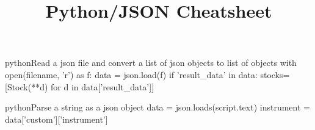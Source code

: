 \documentclass[10pt,a4paper]{article}
\title{\color{w3schools}Python/JSON Cheatsheet
}
\begin{document}
\maketitle
\small
\begin{multicols}{3}

\thispagestyle{empty}
\scriptsize

% 




\begin{codebox}{python}{Read a json file and convert a list of json objects to list of objects}
with open(filename, 'r') as f:
        data = json.load(f)
        if 'result_data' in data:
            stocks=[Stock(**d) for d in data['result_data']]

\end{codebox}

\begin{codebox}{python}{Parse a string as a json object}
data = json.loads(script.text)
instrument = data['custom']['instrument']

\end{codebox}


\AtNextBibliography{\footnotesize}
\printbibliography  
\end{multicols}
\end{document}

